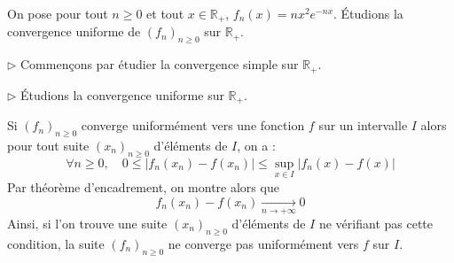 \documentclass[french,11pt,twoside]{VcCours}
\begin{document}
\begin{Exemple} 
On pose pour tout $n \geq 0$ et tout $x \in \mathbb{R}_+$, $f_n(x)= nx^2 e^{-nx}$. 
Étudions la convergence uniforme de $(f_n)_{n \geq 0}$ sur $\mathbb{R}_+$. 

\medskip

$\rhd$ Commençons par étudier la convergence simple sur $\mathbb{R}_+$.

%

\vspace*{5cm}

$\rhd$ Étudions la convergence uniforme sur $\mathbb{R}_+$.

\end{Exemple}

\newpage

\begin{Remarque}{} Si $(f_n)_{n \geq 0}$ converge uniformément vers une fonction $f$ sur un intervalle $I$ alors pour tout suite $(x_n)_{n \geq 0}$ d'éléments de $I$, on a :
$$ \forall n \geq 0, \quad 0 \leq \vert f_n(x_n)-f(x_n) \vert \leq \sup_{x \in I} \vert f_n(x)- f(x) \vert$$
Par théorème d'encadrement, on montre alors que 
$$f_n(x_n)-f(x_n) \underset{n \rightarrow + \infty}{\longrightarrow} 0$$
Ainsi, si l'on trouve une suite $(x_n)_{n \geq 0}$ d'éléments de $I$ ne vérifiant pas cette condition, la suite $(f_n)_{n \geq 0}$ ne converge pas uniformément vers $f$ sur $I$.
\end{Remarque}
\end{document}
